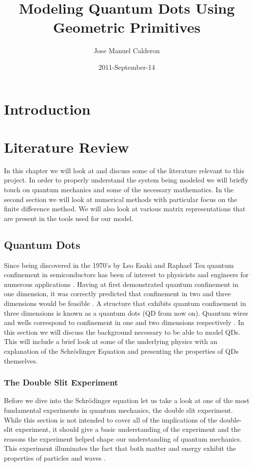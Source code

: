 \documentclass[authoryearcitations]{UoYCSproject}
\author{Jose Manuel Calderon}
\title{Modeling Quantum Dots Using Geometric Primitives}
\date{2011-September-14}
\begin{document}
 
\maketitle
\chapter{Introduction}

\chapter{Literature Review}
In this chapter we will look at and discuss some of the literature relevant to this project. 
In order to properly understand the system being modeled we will briefly touch on quantum mechanics
and some of the necessary mathematics. In the second section we will look at numerical methods with
particular focus on the finite difference method.
We will also look at various matrix representations that are present in the tools used for our
model. 
 
\section{Quantum Dots}
Since being discovered in the 1970's by Leo Esaki and 
Raphael Tsu quantum confinement in semiconductors has been of interest to physicists and engineers for numerous applications 
\cite{dots, reed}. Having at first demonstrated quantum confinement in one dimension, it was correctly predicted that 
confinement in two and three dimensions would be feasible \cite{dots}. A structure that exhibits 
quantum confinement in three dimensions is known as a quantum dots (QD from now on). Quantum wires and 
wells correspond to confinement in one and two dimensions respectively \cite{dots}. In this section we will discuss the
background necessary to be able to model QDs. This will include a brief look at some of the underlying physics with an 
explanation of the Schr\"{o}dinger Equation and 
presenting the properties of QDs themselves. 

\subsection{The Double Slit Experiment}
Before we dive into the Schr\"{o}dinger equation let us take a look at one of the most fundamental experiments in
quantum mechanics, the double slit experiment. While this section is not intended to cover all of the implications
of the double-slit experiment, it should give a basic understanding of the experiment and the reasons the experiment
helped shape our understanding of quantum mechanics. This experiment illuminates the fact that both matter and energy 
exhibit the properties of particles and waves \cite{qp}. 
\end{document}
